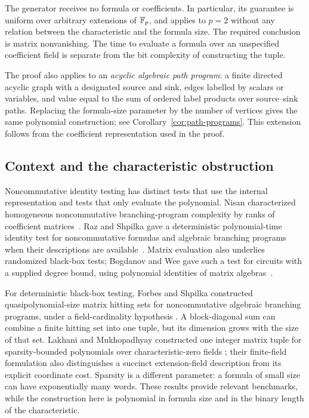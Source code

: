The generator receives no formula or coefficients. In particular, its
guarantee is uniform over arbitrary extensions of $\mathbb F_p$, and applies to
$p=2$ without any relation between the characteristic and the formula size.
The required conclusion is matrix nonvanishing. The time to evaluate a
formula over an unspecified coefficient field is separate from the bit
complexity of constructing the tuple.

The proof also applies to an \emph{acyclic algebraic path program}: a finite
directed acyclic graph with a designated source and sink, edges labelled by
scalars or variables, and value equal to the sum of ordered label products
over source--sink paths. Replacing the formula-size parameter by the number
of vertices gives the same polynomial construction; see
Corollary~\ref{cor:path-programs}. This extension follows from the coefficient
representation used in the proof.

\subsection{Context and the characteristic obstruction}

Noncommutative identity testing has distinct tests that use the internal
representation and tests that only evaluate the polynomial. Nisan
characterized homogeneous noncommutative branching-program complexity by
ranks of coefficient matrices~\cite[Theorem~1]{Nisan1991}. Raz and Shpilka gave
a deterministic polynomial-time identity test for noncommutative formulas
and algebraic branching programs when their descriptions are
available~\cite{RS2005}. Matrix evaluation also underlies randomized
black-box tests; Bogdanov and Wee gave such a test for circuits with a
supplied degree bound, using polynomial identities of matrix
algebras~\cite[Theorem~4.2]{BW2005}.

For deterministic black-box testing, Forbes and Shpilka constructed
quasipolynomial-size matrix hitting sets for noncommutative algebraic
branching programs, under a field-cardinality hypothesis
\cite[Corollary~4.7]{FS2013}. A block-diagonal sum can combine a finite
hitting set into one tuple, but its dimension grows with the size of that
set. Lakhani and Mukhopadhyay constructed one integer matrix tuple for
sparsity-bounded polynomials over characteristic-zero fields
\cite[Theorem~2.1 and Remark~2.6]{LM2026}; their finite-field formulation
also distinguishes a succinct extension-field description from its explicit
coordinate cost. Sparsity is a different parameter: a formula of small size
can have exponentially many words. These results provide relevant
benchmarks, while the construction here is polynomial in formula size
and in the binary length of the characteristic.

